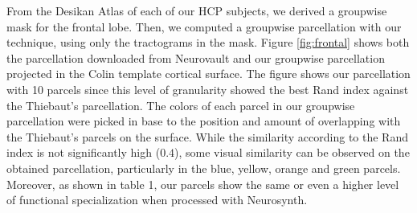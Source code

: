 \begin{table}[t]
\centering
{}
% 
\vspace{0.3cm}
\caption*{Table 1. Spatial correlation value reported by Neurosynth for specific
                   terms in each parcel of \citet{ThiebautdeSchotten2016} and
                   for our parcels. Enumeration comes from figure~\ref{fig:frontal}.} 
\end{table}

From the Desikan Atlas \citep{Desikan2006} of each of our HCP subjects, we
derived a groupwise mask for the frontal lobe. Then, we computed a groupwise 
parcellation with our technique, using only the tractograms in the mask. Figure
\ref{fig:frontal} shows both the parcellation downloaded from Neurovault
and our groupwise parcellation projected in the Colin template cortical surface.
The figure shows our parcellation with 10 parcels since this level of
granularity showed the best Rand index against the Thiebaut's parcellation.
The colors of each parcel in our groupwise parcellation were picked in base to
the position and amount of overlapping with the Thiebaut's parcels on the
surface. While the similarity according to the Rand index is not significantly
high ($0.4$), some visual similarity can be observed on the obtained parcellation,
particularly in the blue, yellow, orange and green parcels. Moreover, as shown in
table 1, our parcels show the same or even a higher level of functional
specialization when processed with Neurosynth.

